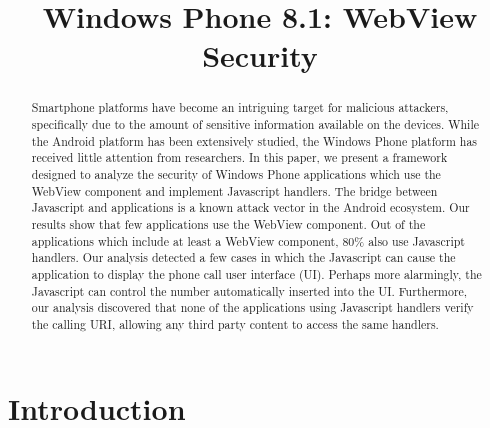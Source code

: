 \documentclass[conference]{IEEEtran}
\begin{document}
\title{Windows Phone 8.1: WebView Security}

\author{
\and
{}
}

\maketitle


\begin{abstract}
Smartphone platforms have become an intriguing target for malicious attackers, specifically due to the amount of sensitive information available on the devices.
While the Android platform has been extensively studied, the Windows Phone platform has received little attention from researchers.
In this paper, we present a framework designed to analyze the security of Windows Phone applications which use the WebView component and implement Javascript handlers.
The bridge between Javascript and applications is a known attack vector in the Android ecosystem.
Our results show that few applications use the WebView component.
Out of the applications which include at least a WebView component, 80\% also use Javascript handlers.
Our analysis detected a few cases in which the Javascript can cause the application to display the phone call user interface (UI).
Perhaps more alarmingly, the Javascript can control the number automatically inserted into the UI.
Furthermore, our analysis discovered that none of the applications using Javascript handlers verify the calling URI, allowing any third party content to access the same handlers.
\end{abstract}


\section{Introduction}
\end{document}
